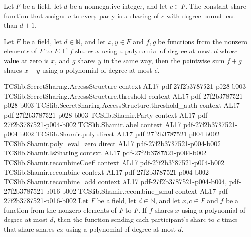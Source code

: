 \begin{theorem}
\label{TCSlib.Shamir.isSharing_const}
\leanok
{}
Let $F$ be a field, let $d$ be a nonnegative integer, and let $c\in F$. The constant
share function that assigns $c$ to every party is a sharing of $c$ with degree bound
less than $d+1$.
\end{theorem}

\begin{theorem}
\label{TCSlib.Shamir.IsSharing.add}
\leanok
{}
Let $F$ be a field, let $d\in\mathbb N$, and let $x,y\in F$ and $f,g$ be functions from
the nonzero elements of $F$ to $F$. If $f$ shares $x$ using a polynomial of degree at
most $d$ whose value at zero is $x$, and $g$ shares $y$ in the same way, then the
pointwise sum $f+g$ shares $x+y$ using a polynomial of degree at most $d$.
\end{theorem}

\begin{theorem}
\label{TCSlib.Shamir.IsSharing.smul}
\leanok
\proofstep
  {TCSlib.SecretSharing.AccessStructure}
  {context}
  {AL17}
  {pdf-27f2b3787521-p028-b003}
\proofstep
  {TCSlib.SecretSharing.AccessStructure.threshold}
  {context}
  {AL17}
  {pdf-27f2b3787521-p028-b003}
\proofstep
  {TCSlib.SecretSharing.AccessStructure.threshold_auth}
  {context}
  {AL17}
  {pdf-27f2b3787521-p028-b003}
\proofstep
  {TCSlib.Shamir.Party}
  {context}
  {AL17}
  {pdf-27f2b3787521-p004-b002}
\proofstep
  {TCSlib.Shamir.label}
  {context}
  {AL17}
  {pdf-27f2b3787521-p004-b002}
\proofstep
  {TCSlib.Shamir.poly}
  {direct}
  {AL17}
  {pdf-27f2b3787521-p004-b002}
\proofstep
  {TCSlib.Shamir.poly_eval_zero}
  {direct}
  {AL17}
  {pdf-27f2b3787521-p004-b002}
\proofstep
  {TCSlib.Shamir.IsSharing}
  {context}
  {AL17}
  {pdf-27f2b3787521-p004-b002}
\proofstep
  {TCSlib.Shamir.recombineCoeff}
  {context}
  {AL17}
  {pdf-27f2b3787521-p004-b002}
\proofstep
  {TCSlib.Shamir.recombine}
  {context}
  {AL17}
  {pdf-27f2b3787521-p004-b002}
\proofstep
  {TCSlib.Shamir.recombine_add}
  {context}
  {AL17}
  {pdf-27f2b3787521-p004-b004,
    pdf-27f2b3787521-p016-b002}
\proofstep
  {TCSlib.Shamir.recombine_smul}
  {context}
  {AL17}
  {pdf-27f2b3787521-p016-b002}
Let $F$ be a field, let $d\in\mathbb N$, and let $x,c\in F$ and $f$ be a function from
the nonzero elements of $F$ to $F$. If $f$ shares $x$ using a polynomial of degree at
most $d$, then the function sending each participant's share to $c$ times that share
shares $cx$ using a polynomial of degree at most $d$.
\end{theorem}

